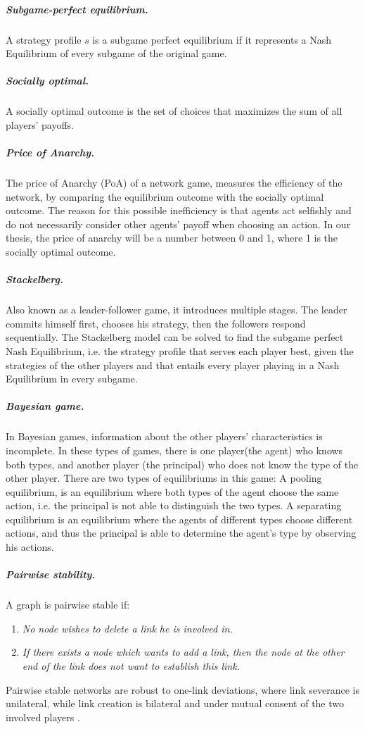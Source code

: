 \subparagraph{Subgame-perfect equilibrium.}
A strategy profile $s$ is a subgame perfect equilibrium if it represents a Nash Equilibrium of every subgame of the original game.
\subparagraph{Socially optimal.}
A socially optimal outcome is the set of choices that maximizes the sum of all players' payoffs. 
\subparagraph{Price of Anarchy.}
The price of Anarchy (PoA) of a network game, measures the efficiency of the network, by comparing the equilibrium outcome with the socially optimal outcome. The reason for this possible inefficiency is that agents act selfishly and do not necessarily consider other agents' payoff when choosing an action. In our thesis, the price of anarchy will be a number between 0 and 1, where 1 is the socially optimal outcome.
\subparagraph{Stackelberg.}
Also known as a leader-follower game, it introduces multiple stages. The leader commits himself first, chooses his strategy, then the followers respond sequentially. The Stackelberg model can be solved to find the subgame perfect Nash Equilibrium, i.e. the strategy profile that serves each player best, given the strategies of the other players and that entails every player playing in a Nash Equilibrium in every subgame.
\subparagraph{Bayesian game.}
In Bayesian games, information about the other players' characteristics is incomplete. In these types of games, there is one player(the agent) who knows both types, and another player (the principal) who does not know the type of the other player. There are two types of equilibriums in this game:
A pooling equilibrium, is an equilibrium where both types of the agent choose the same action, i.e. the principal is not able to distinguish the two types. 
A separating equilibrium is an equilibrium where the agents of different types choose different actions, and thus the principal is able to determine the agent's type by observing his actions.
\subparagraph{Pairwise stability.}
A graph is pairwise stable if:
 \begin{enumerate}
\item \textit{No node wishes to delete a link he is involved in.}
\item \textit{If there exists a node which wants to add a link, then the node at the other end of the link does not want to establish this link.}
\end{enumerate} 
Pairwise stable networks are robust to one-link deviations, where link
severance is unilateral, while link creation is bilateral and under mutual consent of the two involved
players \cite{calvo2009pairwise}.

